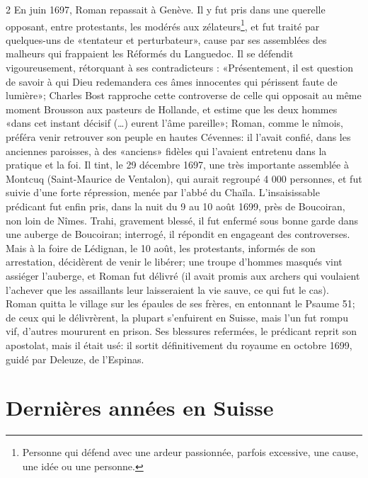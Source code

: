 {\begin{multicols}{2}
En juin 1697, Roman repassait à Genève. Il y fut pris dans une querelle opposant, entre protestants, les modérés aux zélateurs\footnote{Personne qui défend avec une ardeur passionnée, parfois excessive, une cause, une idée ou une personne.}, et fut traité par quelques-uns de «tentateur et perturbateur», cause par ses assemblées des malheurs qui frappaient les Réformés du Languedoc. Il se défendit vigoureusement, rétorquant à ses contradicteurs : «Présentement, il est question de savoir à qui Dieu redemandera ces âmes innocentes qui périssent faute de lumière»; Charles Bost rapproche cette controverse de celle qui opposait au même moment Brousson aux pasteurs de Hollande, et estime que les deux hommes «dans cet instant décisif (…) eurent l’âme pareille»; Roman, comme le nîmois, préféra venir retrouver son peuple en hautes Cévennes: il l’avait confié, dans les anciennes paroisses, à des «anciens» fidèles qui l’avaient entretenu dans la pratique et la foi. Il tint, le 29 décembre 1697, une très importante assemblée à Montcuq (Saint-Maurice de Ventalon), qui aurait regroupé 4 000 personnes, et fut suivie d’une forte répression, menée par l’abbé du Chaïla. L’insaisissable prédicant fut enfin pris, dans la nuit du 9 au 10 août 1699, près de Boucoiran, non loin de Nîmes. Trahi, gravement blessé, il fut enfermé sous bonne garde dans une auberge de Boucoiran; interrogé, il répondit en engageant des controverses. Mais à la foire de Lédignan, le 10 août, les protestants, informés de son arrestation, décidèrent de venir le libérer; une troupe d’hommes masqués vint assiéger l’auberge, et Roman fut délivré (il avait promis aux archers qui voulaient l’achever que les assaillants leur laisseraient la vie sauve, ce qui fut le cas). Roman quitta le village sur les épaules de ses frères, en entonnant le Psaume 51; de ceux qui le délivrèrent, la plupart s’enfuirent en Suisse, mais l’un fut rompu vif, d’autres moururent en prison. Ses blessures refermées, le prédicant reprit son apostolat, mais il était usé: il sortit définitivement du royaume en octobre 1699, guidé par Deleuze, de l’Espinas.

\section*{Dernières années en Suisse}


\end{multicols}}
